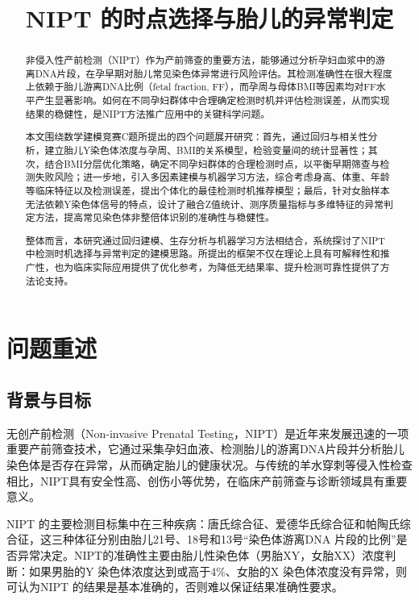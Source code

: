 \documentclass[withoutpreface]{cumcmthesis}
\title{NIPT 的时点选择与胎儿的异常判定}
\begin{document}
\maketitle

\begin{abstract}
  非侵入性产前检测（NIPT）作为产前筛查的重要方法，能够通过分析孕妇血浆中的游离DNA片段，在孕早期对胎儿常见染色体异常进行风险评估。其检测准确性在很大程度上依赖于胎儿游离DNA比例（fetal fraction, FF），而孕周与母体BMI等因素均对FF水平产生显著影响。如何在不同孕妇群体中合理确定检测时机并评估检测误差，从而实现结果的稳健性，是NIPT方法推广应用中的关键科学问题。

  本文围绕数学建模竞赛C题所提出的四个问题展开研究：首先，通过回归与相关性分析，建立胎儿Y染色体浓度与孕周、BMI的关系模型，检验变量间的统计显著性；其次，结合BMI分层优化策略，确定不同孕妇群体的合理检测时点，以平衡早期筛查与检测失败风险；进一步地，引入多因素建模与机器学习方法，综合考虑身高、体重、年龄等临床特征以及检测误差，提出个体化的最佳检测时机推荐模型；最后，针对女胎样本无法依赖Y染色体信号的特点，设计了融合Z值统计、测序质量指标与多维特征的异常判定方法，提高常见染色体非整倍体识别的准确性与稳健性。
  
  整体而言，本研究通过回归建模、生存分析与机器学习方法相结合，系统探讨了NIPT中检测时机选择与异常判定的建模思路。所提出的框架不仅在理论上具有可解释性和推广性，也为临床实际应用提供了优化参考，为降低无结果率、提升检测可靠性提供了方法论支持。
\end{abstract}

\section{问题重述}
\subsection{背景与目标}
无创产前检测（Non-invasive Prenatal Testing，NIPT）是近年来发展迅速的一项重要产前筛查技术，它通过采集孕妇血液、检测胎儿的游离DNA片段并分析胎儿染色体是否存在异常，从而确定胎儿的健康状况。与传统的羊水穿刺等侵入性检查相比，NIPT具有安全性高、创伤小等优势，在临床产前筛查与诊断领域具有重要意义。

NIPT 的主要检测目标集中在三种疾病：唐氏综合征、爱德华氏综合征和帕陶氏综合征，这三种体征分别由胎儿21号、18号和13号“染色体游离DNA 片段的比例”是否异常决定。NIPT的准确性主要由胎儿性染色体（男胎XY，女胎XX）浓度判断：如果男胎的Y 染色体浓度达到或高于4\%、女胎的X 染色体浓度没有异常，则可认为NIPT 的结果是基本准确的，否则难以保证结果准确性要求。
\end{document}
